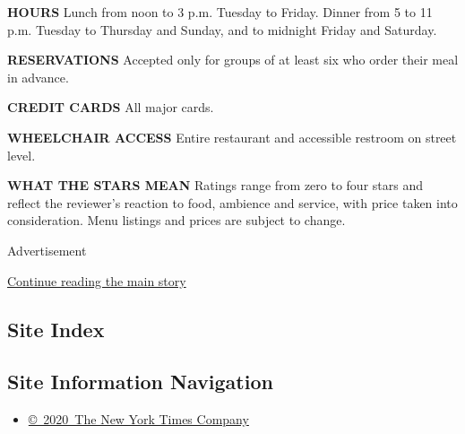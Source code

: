\textbf{HOURS} Lunch from noon to 3 p.m. Tuesday to Friday. Dinner from
5 to 11 p.m. Tuesday to Thursday and Sunday, and to midnight Friday and
Saturday.

\textbf{RESERVATIONS} Accepted only for groups of at least six who order
their meal in advance.

\textbf{CREDIT CARDS} All major cards.

\textbf{WHEELCHAIR ACCESS} Entire restaurant and accessible restroom on
street level.

\textbf{WHAT THE STARS MEAN} Ratings range from zero to four stars and
reflect the reviewer's reaction to food, ambience and service, with
price taken into consideration. Menu listings and prices are subject to
change.

Advertisement

\protect\hyperlink{after-bottom}{Continue reading the main story}

\hypertarget{site-index}{%
\subsection{Site Index}\label{site-index}}

\hypertarget{site-information-navigation}{%
\subsection{Site Information
Navigation}\label{site-information-navigation}}

\begin{itemize}
\tightlist
\item
  \href{https://help.nytimes3xbfgragh.onion/hc/en-us/articles/115014792127-Copyright-notice}{©~2020~The
  New York Times Company}
\end{itemize}

